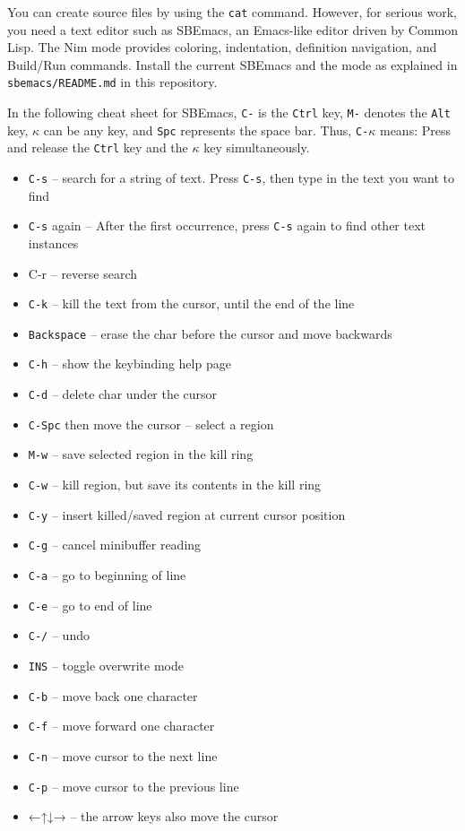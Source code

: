 \documentclass[
  12pt,
]{book}
\providecommand{\tightlist}{%
  \setlength{\itemsep}{0pt}\setlength{\parskip}{0pt}}
\begin{document}
You can create source files by using the \texttt{cat} command. However,
for serious work, you need a text editor such as SBEmacs, an Emacs-like
editor driven by Common Lisp. The Nim mode provides coloring,
indentation, definition navigation, and Build/Run commands. Install the
current SBEmacs and the mode as explained in \texttt{sbemacs/README.md}
in this repository.

In the following cheat sheet for SBEmacs, \texttt{C-} is the
\texttt{Ctrl} key, \texttt{M-} denotes the \texttt{Alt} key, \(\kappa\)
can be any key, and \texttt{Spc} represents the space bar. Thus,
\texttt{C-}\(\kappa\) means: Press and release the \texttt{Ctrl} key and
the \(\kappa\) key simultaneously.

\begin{itemize}
\tightlist
\item
  \texttt{C-s} -- search for a string of text. Press \texttt{C-s}, then
  type in the text you want to find
\item
  \texttt{C-s} again -- After the first occurrence, press \texttt{C-s}
  again to find other text instances
\item
  C-r -- reverse search
\item
  \texttt{C-k} -- kill the text from the cursor, until the end of the
  line
\item
  \texttt{Backspace} -- erase the char before the cursor and move
  backwards
\item
  \texttt{C-h} -- show the keybinding help page
\item
  \texttt{C-d} -- delete char under the cursor
\item
  \texttt{C-Spc} then move the cursor -- select a region
\item
  \texttt{M-w} -- save selected region in the kill ring
\item
  \texttt{C-w} -- kill region, but save its contents in the kill ring
\item
  \texttt{C-y} -- insert killed/saved region at current cursor position
\item
  \texttt{C-g} -- cancel minibuffer reading
\item
  \texttt{C-a} -- go to beginning of line
\item
  \texttt{C-e} -- go to end of line
\item
  \texttt{C-/} -- undo
\item
  \texttt{INS} -- toggle overwrite mode
\item
  \texttt{C-b} -- move back one character
\item
  \texttt{C-f} -- move forward one character
\item
  \texttt{C-n} -- move cursor to the next line
\item
  \texttt{C-p} -- move cursor to the previous line
\item
  ←↑↓→ -- the arrow keys also move the cursor
\end{itemize}
\end{document}

